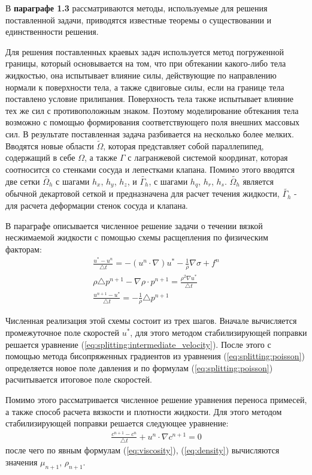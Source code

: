 В \textbf{параграфе 1.3} рассматриваются методы, используемые для решения
поставленной задачи, приводятся известные теоремы о существовании и
единственности решения.

Для решения поставленных краевых задач используется метод погруженной границы,
который основывается на том, что при обтекании какого-либо тела жидкостью, она
испытывает влияние силы, действующие по направлению нормали к поверхности тела,
а также сдвиговые силы, если на границе тела поставлено условие прилипания.
Поверхность тела также испытывает влияние тех же сил с противоположным знаком.
Поэтому моделирование обтекания тела возможно с помощью формирования
соответствующего поля внешних массовых сил.  В результате поставленная задача
разбивается на несколько более мелких. Вводятся новые области $\tilde{\Omega}$,
которая представляет собой параллепипед, содержащий в себе $\Omega$, а также
$\Gamma$ с лагранжевой системой координат, которая соотносится со стенками
сосуда и лепестками клапана.  Помимо этого вводятся две сетки
$\tilde{\Omega_h}$ с шагами $h_x$, $h_y$, $h_z$, и $\tilde{\Gamma_h}$, с шагами
$h_q$, $h_r$, $h_s$. $\tilde{\Omega_h}$ является обычной декартовой сеткой и
предназначена для расчет течения жидкости, $\tilde{\Gamma_h}$ - для расчета
деформации стенок сосуда и клапана.

В параграфе описывается численное решение задачи о течении вязкой
несжимаемой жидкости с помощью схемы расщепления по физическим факторам:
\begin{gather}
    \label{eq:splitting:intermediate_velocity}
    \frac{u^* - u^n}{\triangle t} = - (u^n \cdot \nabla) u^* - \frac{1}{\rho} \nabla \sigma + f^n\\
    \label{eq:splitting:poisson}
    \rho \triangle p^{n+1} - \nabla \rho \cdot p^{n+1} = \frac{\rho^2 \nabla u^*}{\triangle t}\\
    \label{eq:splitting:velocity}
    \frac{u^{n+1} - u^*}{\triangle t} = - \frac{1}{\rho} \triangle p^{n+1}
\end{gather}

Численная реализация этой схемы состоит из трех шагов. Вначале вычисляется
промежуточное поле скоростей $u^{*}$, для этого методом стабилизирующей
поправки решается уравнение (\ref{eq:splitting:intermediate_velocity}). После
этого с помощью метода бисопряженных градиентов из уравнения
(\ref{eq:splitting:poisson}) определяется новое поле давления и по формулам
(\ref{eq:splitting:poisson}) расчитывается итоговое поле скоростей.

Помимо этого рассматривается численное решение уравнения переноса
примесей, а также способ расчета вязкости и плотности жидкости.  Для этого
методом стабилизирующей поправки решается следующее уравнение:
\begin{gather}
    \label{eq:numerical_concentration}
    \frac{c^{n+1} - c^{n}}{\triangle t} + u^{n} \cdot \nabla c^{n+1} = 0
\end{gather}
после чего по явным формулам (\ref{eq:viscosity}), (\ref{eq:density})
вычисляются значения $\mu_{n+1}$, $\rho_{n+1}$.

